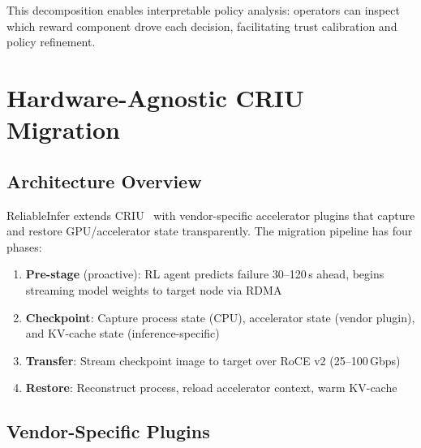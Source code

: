 \documentclass[conference,10pt,letterpaper]{IEEEtran}
\begin{document}
This decomposition enables interpretable policy analysis: operators can inspect which reward component drove each decision, facilitating trust calibration and policy refinement.

\section{Hardware-Agnostic CRIU Migration}
\label{sec:criu}

\subsection{Architecture Overview}

ReliableInfer extends CRIU~\cite{criu2024gpu} with vendor-specific accelerator plugins that capture and restore GPU/accelerator state transparently. The migration pipeline has four phases:

\begin{enumerate}
\item \textbf{Pre-stage} (proactive): RL agent predicts failure 30--120\,s ahead, begins streaming model weights to target node via RDMA
\item \textbf{Checkpoint}: Capture process state (CPU), accelerator state (vendor plugin), and KV-cache state (inference-specific)
\item \textbf{Transfer}: Stream checkpoint image to target over RoCE v2 (25--100\,Gbps)
\item \textbf{Restore}: Reconstruct process, reload accelerator context, warm KV-cache
\end{enumerate}

\subsection{Vendor-Specific Plugins}

\begin{table}[!t]
\caption{CRIU Plugin Implementation by Vendor}
\label{tab:criu}
\centering\scriptsize
{}
\end{table}
\end{document}
